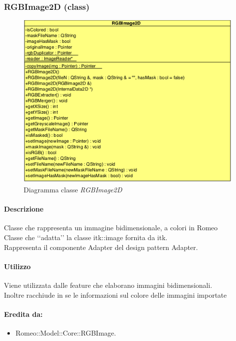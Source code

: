 \subsubsection{RGBImage2D (class)}
\label{RGBImage2D}
\begin{figure}[!h]
\centering
			\includegraphics[scale=1]{./Content/Immagini/modelCore/RGBImage2D.png}
			\caption{Diagramma classe \textsl{ RGBImage2D}}
			\label{RGBImage2D_img}
\end{figure}

\paragraph{Descrizione \\}
Classe che rappresenta un immagine bidimensionale, a colori in Romeo\g{}
\\Classe che \lq\lq{}adatta\rq\rq{} la classe itk::image fornita da itk.
\\Rappresenta il componente Adapter del design pattern\g{} Adapter.

\paragraph{Utilizzo \\}
Viene utilizzata dalle feature\g{} che elaborano immagini bidimensionali.
\\Inoltre racchiude in se le informazioni sul colore delle immagini importate 

\paragraph{Eredita da:}
\begin{itemize}
	\item Romeo::Model::Core::RGBImage.
\end{itemize}

